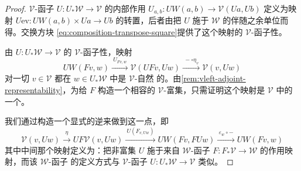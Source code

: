 \begin{proof}
$\mathcal{V}$-函子 $U\colon U_{*}\mathcal{W}\to\mathcal{V}$ 的内部作用
$U_{a,b}\colon UW(a,b)\to\mathcal{V}(Ua,Ub)$ 定义为映射
$U\mathrm{ev}\colon UW(a,b)\times Ua\to Ub$ 的转置，后者由把 $U$ 施于
$\mathcal{W}$ 的\trCartesianClosed{}伴随之余单位而得。交换方块
\eqref{eq:composition-transpose-square}提供了这个映射的 $\mathcal{V}$-函子性。

由 $U\colon U_{*}\mathcal{W}\to\mathcal{V}$ 的 $\mathcal{V}$-函子性，映射
\[ UW(Fv,w)\xrightarrow{\ U_{Fv,w}\ }\mathcal{V}(UFv,Uw)
   \xrightarrow{\ -\circ\eta_{v}\ }\mathcal{V}(v,Uw) \]
对一切 $v\in\mathcal{V}$ 都在 $w\in U_{*}\mathcal{W}$ 中是 $\mathcal{V}$-自然
的。由\cref{rem:vleft-adjoint-representability}，为给 $F$ 构造一个相容的
$\mathcal{V}$-富集，只需证明这个映射是 $\mathcal{V}$ 中的一个\trIsomorphism。

我们通过构造一个显式的逆来做到这一点，即
\[ \mathcal{V}(v,Uw)\xrightarrow{\ \eta\ }UF\mathcal{V}(v,Uw)
   \xrightarrow{\ U(F_{v,Uw})\ }UW(Fv,FUw)
   \xrightarrow{\ \varepsilon_{w}\circ-\ }UW(Fv,w) \]
其中中间那个映射定义为：把非富集\trFunctor{} $U$ 施于来自 $\mathcal{W}$-函子
$F\colon F_{*}\mathcal{V}\to\mathcal{W}$ 的作用映射，而该 $\mathcal{W}$-函子
的定义方式与 $\mathcal{V}$-函子 $U\colon U_{*}\mathcal{W}\to\mathcal{V}$ 类似。


\end{proof}
